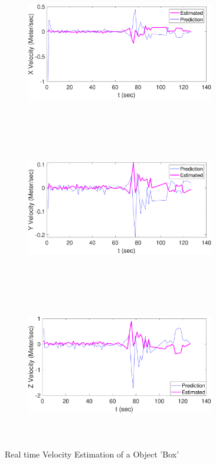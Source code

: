 \begin{figure}
    \centering
    \begin{subfigure}
        \centering
        \includegraphics[height=6.5cm,width=0.9\textwidth]{Images/X_velbox.pdf}
    \end{subfigure}
    \begin{subfigure}
        \centering
        \includegraphics[height=6.5cm,width=0.9\textwidth]{Images/Y_velbox.pdf}
    \end{subfigure}
    \begin{subfigure}
        \centering
        \includegraphics[height=6.5cm,width=0.9\textwidth]{Images/Z_velbox.pdf}
    \end{subfigure}
    \caption{Real time Velocity Estimation of a Object 'Box'}
    \label{Veloestbox}
\end{figure}

